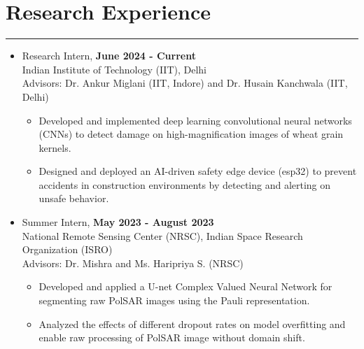 \documentclass[11pt]{article}
\newlength{\sectionvspace}
\begin{document}
	\section*{\bf Research Experience}
	\vspace{\sectionvspace}
	\rule{\textwidth}{0.4pt}
	\begin{itemize}[leftmargin=*,noitemsep,topsep=0pt]
		
		\item Research Intern, \hfill \textbf{June 2024 - Current} \\
		Indian Institute of Technology (IIT), Delhi \\
		Advisors: Dr. Ankur Miglani (IIT, Indore) and Dr. Husain Kanchwala (IIT, Delhi)
		\begin{itemize}[leftmargin=*,noitemsep,topsep=0pt]
			\item Developed and implemented deep learning convolutional neural networks (CNNs) to detect damage on high-magnification images of wheat grain kernels.
			\item Designed and deployed an AI-driven safety edge device (esp32) to prevent accidents in construction environments by detecting and alerting on unsafe behavior.
		\end{itemize}
		
		
\item Summer Intern, \hfill \textbf{May 2023 - August 2023}\\
National Remote Sensing Center (NRSC), Indian Space Research Organization (ISRO)\\
Advisors: Dr. Mishra and Ms. Haripriya S. (NRSC)
\begin{itemize}[leftmargin=*,noitemsep,topsep=0pt]
	\item Developed and applied a U-net Complex Valued Neural Network for segmenting raw PolSAR images using the Pauli representation.
	\item Analyzed the effects of different dropout rates on model overfitting and enable raw processing of PolSAR image without domain shift.
\end{itemize}
		

\end{itemize}
\end{document}
